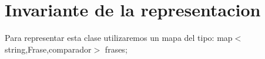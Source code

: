 \hypertarget{repConjunto_invConjunto}{}\section{Invariante de la representacion}\label{repConjunto_invConjunto}
Para representar esta clase utilizaremos un mapa del tipo\+: map$<$string,\+Frase,comparador$>$ frases; 